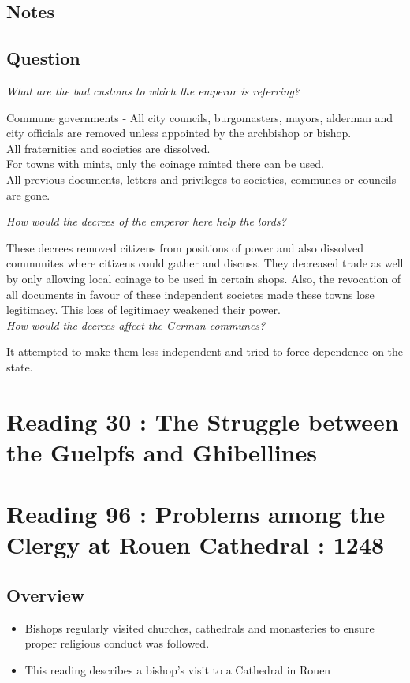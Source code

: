 \documentclass[12pt]{article}
\begin{document}
\subsection*{Notes}

\subsection*{Question}

\textit{What are the bad customs to which the emperor is referring?}

Commune governments - All city councils, burgomasters, mayors, alderman and city officials are removed unless appointed by the archbishop or bishop. \\

All fraternities and societies are dissolved.\\

For towns with mints, only the coinage minted there can be used.\\

All previous documents, letters and privileges to societies, communes or councils are gone.


\textit{How would the decrees of the emperor here help the lords?}

These decrees removed citizens from positions of power and also dissolved communites where citizens could gather and discuss. They decreased trade as well by only allowing local coinage to be used in certain shops. Also, the revocation of all documents in favour of these independent societes made these towns lose legitimacy. This loss of legitimacy weakened their power.\\

\textit{How would the decrees affect the German communes?}

It attempted to make them less independent and tried to force dependence on the state.\\

\section*{Reading 30 : The Struggle between the Guelpfs and Ghibellines}


\section*{Reading 96 : Problems among the Clergy at Rouen Cathedral : 1248}

\subsection*{Overview}
\begin{itemize}
	\item Bishops regularly visited churches, cathedrals and monasteries to ensure proper religious conduct was followed.
	\item This reading describes a bishop's visit to a Cathedral in Rouen
\end{itemize}
\end{document}
